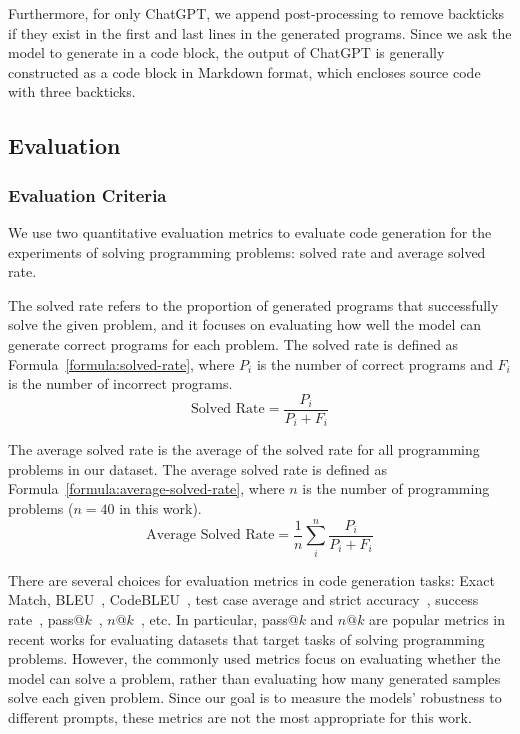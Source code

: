 \documentclass{article}
\begin{document}
Furthermore, for only ChatGPT, we append post-processing to remove backticks if they exist in the first and last lines in the generated programs. Since we ask the model to generate in a code block, the output of ChatGPT is generally constructed as a code block in Markdown format, which encloses source code with three backticks.






\subsection{Evaluation}
\label{sec:experiments:evaluation}





\subsubsection{Evaluation Criteria}
\label{sec:experiments:evaluation:criteria}

We use two quantitative evaluation metrics to evaluate code generation for the experiments of solving programming problems: solved rate and average solved rate.

The solved rate refers to the proportion of generated programs that successfully solve the given problem, and it focuses on evaluating how well the model can generate correct programs for each problem. The solved rate is defined as Formula~\ref{formula:solved-rate}, where $P_i$ is the number of correct programs and $F_i$ is the number of incorrect programs.
\begin{equation}
    \text{Solved Rate} = \frac{P_i}{P_i + F_i}
    \label{formula:solved-rate}
\end{equation}

The average solved rate is the average of the solved rate for all programming problems in our dataset. The average solved rate is defined as Formula~\ref{formula:average-solved-rate}, where $n$ is the number of programming problems ($n=40$ in this work).
\begin{equation}
    \text{Average Solved Rate} = \frac{1}{n}\sum_{i}^{n} \frac{P_i}{P_i + F_i}
    \label{formula:average-solved-rate}
\end{equation}

There are several choices for evaluation metrics in code generation tasks:
Exact Match, BLEU~\citep{papineni2002bleu}, CodeBLEU~\citep{ren2020codebleu}, test case average and strict accuracy~\citep{hendrycks2021apps}, success rate~\citep{kulal2019spoc}, pass@$k$~\citep{chen2021codex}, $n@k$~\citep{li2022alphacode}, etc.
In particular, pass@$k$ and $n@k$ are popular metrics in recent works for evaluating datasets that target tasks of solving programming problems.
However, the commonly used metrics focus on evaluating whether the model can solve a problem, rather than evaluating how many generated samples solve each given problem.
Since our goal is to measure the models' robustness to different prompts, these metrics are not the most appropriate for this work. 
\end{document}
